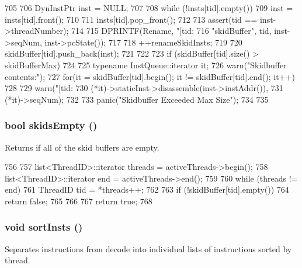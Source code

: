 \begin{DoxyCode}
705 {
706     DynInstPtr inst = NULL;
707 
708     while (!insts[tid].empty()) {
709         inst = insts[tid].front();
710 
711         insts[tid].pop_front();
712 
713         assert(tid == inst->threadNumber);
714 
715         DPRINTF(Rename, "[tid:%
716                 "skidBuffer\n", tid, inst->seqNum, inst->pcState());
717 
718         ++renameSkidInsts;
719 
720         skidBuffer[tid].push_back(inst);
721     }
722 
723     if (skidBuffer[tid].size() > skidBufferMax)
724     {
725         typename InstQueue::iterator it;
726         warn("Skidbuffer contents:\n");
727         for(it = skidBuffer[tid].begin(); it != skidBuffer[tid].end(); it++)
728         {
729             warn("[tid:%
730                     (*it)->staticInst->disassemble(inst->instAddr()),
731                     (*it)->seqNum);
732         }
733         panic("Skidbuffer Exceeded Max Size");
734     }
735 }
\end{DoxyCode}
\hypertarget{classDefaultRename_afe3e2673d17dd5c568862ef5ae68b4d8}{
\subsubsection[{skidsEmpty}]{\setlength{\rightskip}{0pt plus 5cm}bool skidsEmpty ()}}
\label{classDefaultRename_afe3e2673d17dd5c568862ef5ae68b4d8}
Returns if all of the skid buffers are empty. 


\begin{DoxyCode}
756 {
757     list<ThreadID>::iterator threads = activeThreads->begin();
758     list<ThreadID>::iterator end = activeThreads->end();
759 
760     while (threads != end) {
761         ThreadID tid = *threads++;
762 
763         if (!skidBuffer[tid].empty())
764             return false;
765     }
766 
767     return true;
768 }
\end{DoxyCode}
\hypertarget{classDefaultRename_a9ff2aa32ab0f40674cb3518108d62f8e}{
\subsubsection[{sortInsts}]{\setlength{\rightskip}{0pt plus 5cm}void sortInsts ()}}
\label{classDefaultRename_a9ff2aa32ab0f40674cb3518108d62f8e}
Separates instructions from decode into individual lists of instructions sorted by thread. 


